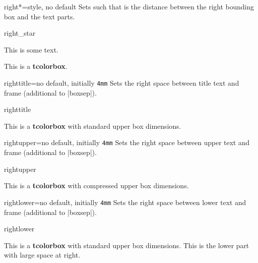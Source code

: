 \clearpage

\begin{docTcbKey}[][doc new=2017-02-16]{right*}{=}{style, no default}
  Sets  such that  is the distance between
  the right bounding box and the text parts.
\begin{exdispExample}{right_star}

\flushright This is some text.
\begin{tcolorbox}[grow to right by=5mm,right*=0mm,
  halign=right,enhanced,show bounding box]
This is a \textbf{tcolorbox}.
\end{tcolorbox}
\end{exdispExample}
\end{docTcbKey}



\begin{docTcbKey}{righttitle}{=}{no default, initially \texttt{4mm}}
  Sets the right space between title text and frame (additional to |boxsep|).
\begin{exdispExample}{righttitle}

\begin{tcolorbox}[width=5cm,righttitle=2cm,title=My very long title text]
This is a \textbf{tcolorbox} with standard upper box dimensions.
\end{tcolorbox}
\end{exdispExample}
\end{docTcbKey}


\begin{docTcbKey}{rightupper}{=}{no default, initially \texttt{4mm}}
  Sets the right space between upper text and frame (additional to |boxsep|).
\begin{exdispExample}{rightupper}

\begin{tcolorbox}[width=5cm,rightupper=2cm,title=My very long title text]
This is a \textbf{tcolorbox} with compressed upper box dimensions.
\end{tcolorbox}
\end{exdispExample}
\end{docTcbKey}


\clearpage
\begin{docTcbKey}{rightlower}{=}{no default, initially \texttt{4mm}}
  Sets the right space between lower text and frame (additional to |boxsep|).
\begin{exdispExample}{rightlower}

\begin{tcolorbox}[width=5cm,rightlower=2cm]
This is a \textbf{tcolorbox} with standard upper box dimensions.
\tcblower
This is the lower part with large space at right.
\end{tcolorbox}
\end{exdispExample}
\end{docTcbKey}



